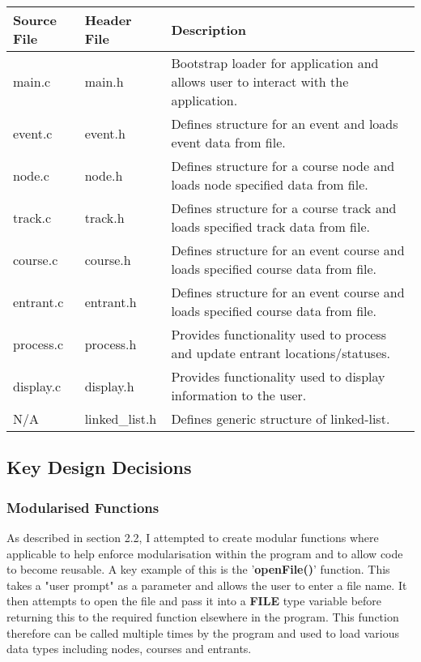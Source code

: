 \documentclass{article}
\begin{document}
\begin{tabular}{| p{1.5cm} | p{1.7cm} | p{6.2cm} |}
\hline
Source File & Header File & Description \\
\hline
main.c & main.h & Bootstrap loader for application and allows user to interact with the application. \\
\hline
event.c & event.h & Defines structure for an event and loads event data from file. \\
\hline
node.c & node.h & Defines structure for a course node and loads node specified data from file. \\
\hline
track.c & track.h & Defines structure for a course track and loads specified track data from file. \\
\hline
course.c & course.h & Defines structure for an event course and loads specified course data from file. \\
\hline
entrant.c & entrant.h & Defines structure for an event course and loads specified course data from file. \\
\hline
process.c & process.h & Provides functionality used to process and update entrant locations/statuses. \\
\hline
display.c & display.h & Provides functionality used to display information to the user. \\
\hline
N/A & linked\_list.h & Defines generic structure of linked-list. \\
\hline

\end{tabular} 

\subsection{Key Design Decisions}

\subsubsection{Modularised Functions}

As described in section 2.2, I attempted to create modular functions where applicable to help enforce modularisation within the program and to allow code to become reusable. A key example of this is the '\textbf{openFile()}' function. This takes a "user prompt" as a parameter and allows the user to enter a file name. It then attempts to open the file and pass it into a \textbf{FILE} type variable before returning this to the required function elsewhere in the program. This function therefore can be called multiple times by the program and used to load various data types including nodes, courses and entrants.
\end{document}
